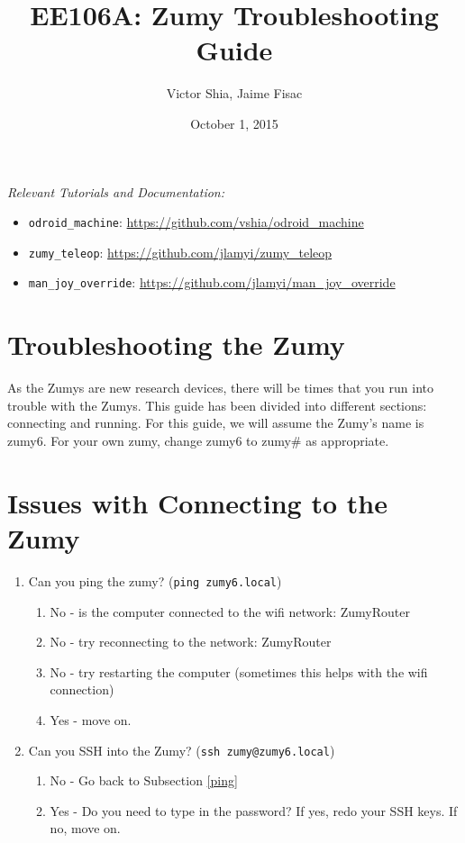 \documentclass[10pt]{article}
\begin{document}
\title{EE106A: Zumy Troubleshooting Guide}
\author{Victor Shia, Jaime Fisac}
\date{October 1, 2015}
\maketitle

\emph{Relevant Tutorials and Documentation:} 
\begin{itemize}
\item \verb=odroid_machine=: \url{https://github.com/vshia/odroid_machine}
\item \verb=zumy_teleop=: \url{https://github.com/jlamyi/zumy_teleop}
\item \verb=man_joy_override=: \url{https://github.com/jlamyi/man_joy_override}
\end{itemize}

\tableofcontents


\section{Troubleshooting the Zumy}
As the Zumys are new research devices, there will be times that you run into trouble with the Zumys.
This guide has been divided into different sections: connecting and running.
For this guide, we will assume the Zumy's name is zumy6.  
For your own zumy, change zumy6 to zumy\# as appropriate.

\section{Issues with Connecting to the Zumy} \label{connecting}

\begin{enumerate}
  \item Can you ping the zumy?  (\verb=ping zumy6.local=) \label{ping}
  \begin{enumerate}
    \item No - is the computer connected to the wifi network: ZumyRouter 
    \item No - try reconnecting to the network: ZumyRouter
    \item No - try restarting the computer (sometimes this helps with the wifi connection)
    \item Yes - move on. 
  \end{enumerate}
  \item Can you SSH into the Zumy?  (\verb=ssh zumy@zumy6.local=)
  \begin{enumerate}
    \item No - Go back to Subsection \ref{ping}
    \item Yes - Do you need to type in the password?  If yes, redo your SSH keys.  If no, move on.
  \end{enumerate}
  
\end{enumerate}
\end{document}
